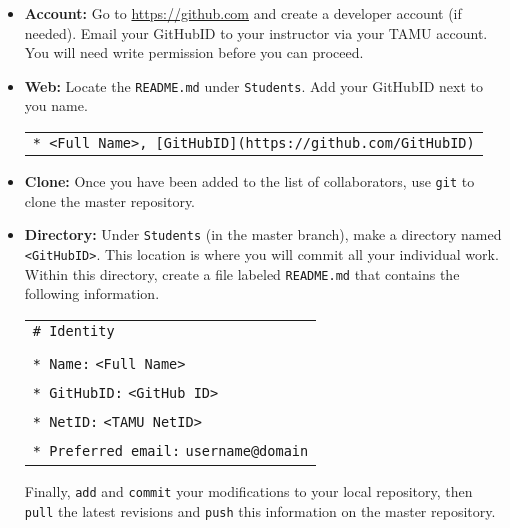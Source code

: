 \documentclass[11pt]{article}
\begin{document}
\begin{itemize}
\item \textbf{Account:} Go to \url{https://github.com} and create a developer account (if needed).
Email your GitHubID to your instructor via your TAMU account.
You will need write permission before you can proceed.
\item \textbf{Web:} Locate the \texttt{README.md} under \texttt{Students}.
Add your GitHubID next to you name.
\begin{center}
\begin{tabular}{l}
\texttt{* <Full Name>, [GitHubID](https://github.com/GitHubID)}
\end{tabular}
\end{center}
\item \textbf{Clone:} Once you have been added to the list of collaborators, use \texttt{git} to clone the master repository.
\item \textbf{Directory:} Under \texttt{Students} (in the master branch), make a directory named \texttt{<GitHubID>}.
This location is where you will commit all your individual work.
Within this directory, create a file labeled \texttt{README.md} that contains the following information.
\begin{center}
\begin{tabular}{l}
\texttt{\# Identity} \\
\\
\texttt{* Name:} \texttt{<Full Name>} \\
\texttt{* GitHubID:} \texttt{<GitHub ID>} \\
\texttt{* NetID:} \texttt{<TAMU NetID>} \\
\texttt{* Preferred email:} \texttt{username@domain} \\
\end{tabular}
\end{center}
Finally, \texttt{add} and \texttt{commit} your modifications to your local repository, then \texttt{pull} the latest revisions and \texttt{push} this information on the master repository.
\end{itemize}
\end{document}

